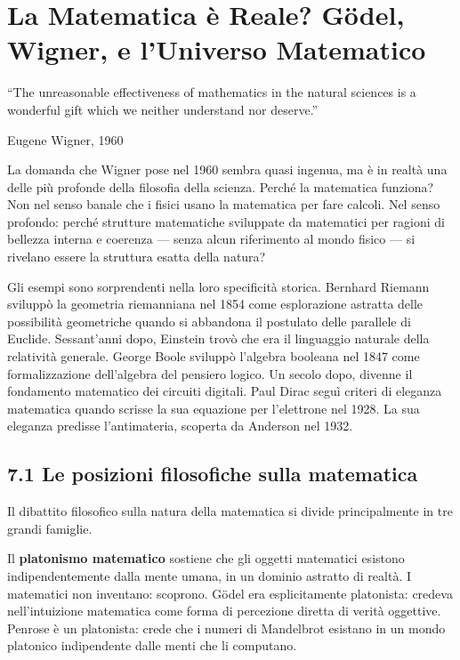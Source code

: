 \documentclass[11.5pt,a4paper,openany]{book}
\theoremstyle{remark}
\begin{document}
\chapter{La Matematica è Reale? Gödel, Wigner, e l'Universo Matematico}

\epigraph{``The unreasonable effectiveness of mathematics in the natural sciences is a wonderful gift which we neither understand nor deserve.''}{Eugene Wigner, 1960}

La domanda che Wigner pose nel 1960 sembra quasi ingenua, ma è in realtà una delle più profonde della filosofia della scienza. Perché la matematica funziona? Non nel senso banale che i fisici usano la matematica per fare calcoli. Nel senso profondo: perché strutture matematiche sviluppate da matematici per ragioni di bellezza interna e coerenza --- senza alcun riferimento al mondo fisico --- si rivelano essere la struttura esatta della natura?

Gli esempi sono sorprendenti nella loro specificità storica. Bernhard Riemann sviluppò la geometria riemanniana nel 1854 come esplorazione astratta delle possibilità geometriche quando si abbandona il postulato delle parallele di Euclide. Sessant'anni dopo, Einstein trovò che era il linguaggio naturale della relatività generale. George Boole sviluppò l'algebra booleana nel 1847 come formalizzazione dell'algebra del pensiero logico. Un secolo dopo, divenne il fondamento matematico dei circuiti digitali. Paul Dirac seguì criteri di eleganza matematica quando scrisse la sua equazione per l'elettrone nel 1928. La sua eleganza predisse l'antimateria, scoperta da Anderson nel 1932.

\section{7.1 Le posizioni filosofiche sulla matematica}

Il dibattito filosofico sulla natura della matematica si divide principalmente in tre grandi famiglie.

Il \textbf{platonismo matematico} sostiene che gli oggetti matematici esistono indipendentemente dalla mente umana, in un dominio astratto di realtà. I matematici non inventano: scoprono. Gödel era esplicitamente platonista: credeva nell'intuizione matematica come forma di percezione diretta di verità oggettive. Penrose è un platonista: crede che i numeri di Mandelbrot esistano in un mondo platonico indipendente dalle menti che li computano.
\end{document}
